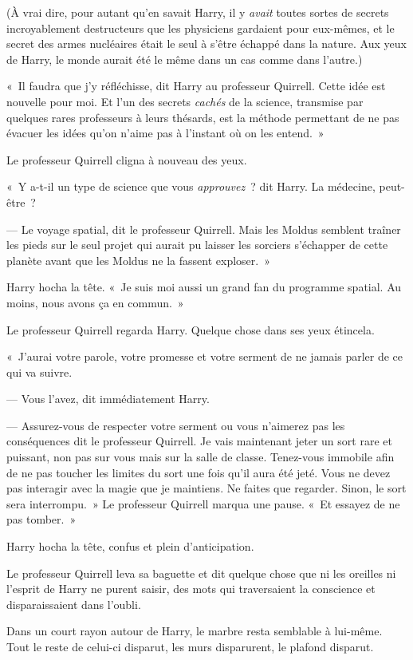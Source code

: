 (À vrai dire, pour autant qu'en savait Harry, il y \emph{avait} toutes sortes de secrets incroyablement destructeurs que les physiciens gardaient pour eux-mêmes, et le secret des armes nucléaires était le seul à s'être échappé dans la nature. Aux yeux de Harry, le monde aurait été le même dans un cas comme dans l'autre.)

«~Il faudra que j'y réfléchisse, dit Harry au professeur Quirrell. Cette idée est nouvelle pour moi. Et l'un des secrets \emph{cachés} de la science, transmise par quelques rares professeurs à leurs thésards, est la méthode permettant de ne pas évacuer les idées qu'on n'aime pas à l'instant où on les entend.~»

Le professeur Quirrell cligna à nouveau des yeux.

«~Y a-t-il un type de science que vous \emph{approuvez}~? dit Harry. La médecine, peut-être~?

--- Le voyage spatial, dit le professeur Quirrell. Mais les Moldus semblent traîner les pieds sur le seul projet qui aurait pu laisser les sorciers s'échapper de cette planète avant que les Moldus ne la fassent exploser.~»

Harry hocha la tête. «~Je suis moi aussi un grand fan du programme spatial. Au moins, nous avons ça en commun.~»

Le professeur Quirrell regarda Harry. Quelque chose dans ses yeux étincela.

«~J'aurai votre parole, votre promesse et votre serment de ne jamais parler de ce qui va suivre.

--- Vous l'avez, dit immédiatement Harry.

--- Assurez-vous de respecter votre serment ou vous n'aimerez pas les conséquences dit le professeur Quirrell. Je vais maintenant jeter un sort rare et puissant, non pas sur vous mais sur la salle de classe. Tenez-vous immobile afin de ne pas toucher les limites du sort une fois qu'il aura été jeté. Vous ne devez pas interagir avec la magie que je maintiens. Ne faites que regarder. Sinon, le sort sera interrompu.~» Le professeur Quirrell marqua une pause. «~Et essayez de ne pas tomber.~»

Harry hocha la tête, confus et plein d'anticipation.

Le professeur Quirrell leva sa baguette et dit quelque chose que ni les oreilles ni l'esprit de Harry ne purent saisir, des mots qui traversaient la conscience et disparaissaient dans l'oubli.

Dans un court rayon autour de Harry, le marbre resta semblable à lui-même. Tout le reste de celui-ci disparut, les murs disparurent, le plafond disparut.

